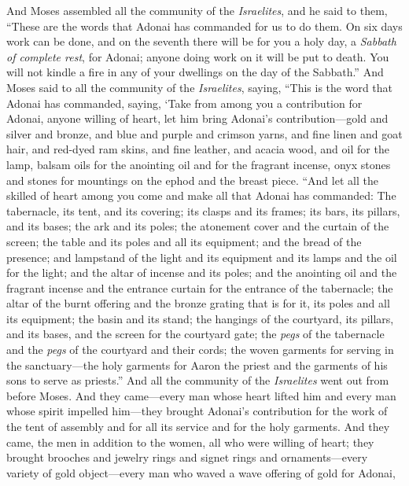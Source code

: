 \begin{biblechapter} %
 And Moses assembled all the community of the \textit{Israelites}, and he said to them, “These are the words that Adonai has commanded for us to do them.
\verse On six days work can be done, and on the seventh there will be for you a holy day, a \textit{Sabbath of complete rest}, for Adonai; anyone doing work on it will be put to death.
\verse You will not kindle a fire in any of your dwellings on the day of the Sabbath.”
\verse And Moses said to all the community of the \textit{Israelites}, saying, “This is the word that Adonai has commanded, saying,
\verse ‘Take from among you a contribution for Adonai, anyone willing of heart, let him bring Adonai’s contribution—gold and silver and bronze,
\verse and blue and purple and crimson yarns, and fine linen and goat hair,
\verse and red-dyed ram skins, and fine leather, and acacia wood,
\verse and oil for the lamp, balsam oils for the anointing oil and for the fragrant incense,
\verse onyx stones and stones for mountings on the ephod and the breast piece.
\verse “And let all the skilled of heart among you come and make all that Adonai has commanded:
\verse The tabernacle, its tent, and its covering; its clasps and its frames; its bars, its pillars, and its bases;
\verse the ark and its poles; the atonement cover and the curtain of the screen;
\verse the table and its poles and all its equipment; and the bread of the presence;
\verse and lampstand of the light and its equipment and its lamps and the oil for the light;
\verse and the altar of incense and its poles; and the anointing oil and the fragrant incense and the entrance curtain for the entrance of the tabernacle;
\verse the altar of the burnt offering and the bronze grating that is for it, its poles and all its equipment; the basin and its stand;
\verse the hangings of the courtyard, its pillars, and its bases, and the screen for the courtyard gate;
\verse the \textit{pegs} of the tabernacle and the \textit{pegs} of the courtyard and their cords;
\verse the woven garments for serving in the sanctuary—the holy garments for Aaron the priest and the garments of his sons to serve as priests.”
\verse And all the community of the \textit{Israelites} went out from before Moses.
\verse And they came—every man whose heart lifted him and every man whose spirit impelled him—they brought Adonai’s contribution for the work of the tent of assembly and for all its service and for the holy garments.
\verse And they came, the men in addition to the women, all who were willing of heart; they brought brooches and jewelry rings and signet rings and ornaments—every variety of gold object—every man who waved a wave offering of gold for Adonai,

\end{biblechapter}
